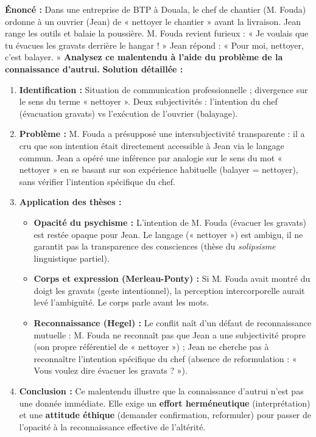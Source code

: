 \documentclass[11pt]{article}
\newcommand{\cle}[1]{{\popxbold\color{popdark}#1}}
\begin{document}
\begin{exoresolu}
\textbf{Énoncé :} Dans une entreprise de BTP à Douala, le chef de chantier (M. Fouda) ordonne à un ouvrier (Jean) de « nettoyer le chantier » avant la livraison. Jean range les outils et balaie la poussière. M. Fouda revient furieux : « Je voulais que tu évacues les gravats derrière le hangar ! » Jean répond : « Pour moi, nettoyer, c'est balayer. » \textbf{Analysez ce malentendu à l'aide du problème de la connaissance d'autrui.}
\tcblower
\textbf{Solution détaillée :}
\begin{enumerate}
    \item \textbf{Identification :} Situation de communication professionnelle ; divergence sur le sens du terme « nettoyer ». Deux subjectivités : l'intention du chef (évacuation gravats) vs l'exécution de l'ouvrier (balayage).
    \item \textbf{Problème :} M. Fouda a présupposé une \cle{intersubjectivité} transparente : il a cru que son intention était directement accessible à Jean via le langage commun. Jean a opéré une \cle{inférence par analogie} sur le sens du mot « nettoyer » en se basant sur son expérience habituelle (balayer = nettoyer), sans vérifier l'intention spécifique du chef.
    \item \textbf{Application des thèses :}
    \begin{itemize}
        \item \textbf{Opacité du psychisme :} L'intention de M. Fouda (évacuer les gravats) est restée opaque pour Jean. Le langage (« nettoyer ») est ambigu, il ne garantit pas la transparence des consciences (thèse du \emph{solipsisme} linguistique partiel).
        \item \textbf{Corps et expression (Merleau-Ponty) :} Si M. Fouda avait montré du doigt les gravats (geste intentionnel), la perception intercorporelle aurait levé l'ambiguïté. Le corps parle avant les mots.
        \item \textbf{Reconnaissance (Hegel) :} Le conflit naît d'un défaut de \cle{reconnaissance} mutuelle : M. Fouda ne reconnaît pas que Jean a une subjectivité propre (son propre référentiel de « nettoyer ») ; Jean ne cherche pas à reconnaître l'intention spécifique du chef (absence de reformulation : « Vous voulez dire évacuer les gravats ? »).
    \end{itemize}
    \item \textbf{Conclusion :} Ce malentendu illustre que la connaissance d'autrui n'est pas une donnée immédiate. Elle exige un \textbf{effort herméneutique} (interprétation) et une \textbf{attitude éthique} (demander confirmation, reformuler) pour passer de l'opacité à la reconnaissance effective de l'altérité.
\end{enumerate}
\end{exoresolu}
\end{document}
